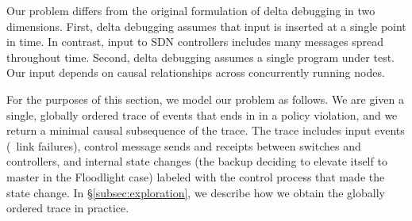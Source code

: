 
Our problem differs from the original formulation of delta debugging in two dimensions.
First, delta debugging assumes that input is inserted at a single point in
time. In contrast, input to SDN controllers includes many messages spread
throughout time.
Second, delta debugging assumes a single program under test. Our input depends on
causal relationships across
concurrently running nodes.

For the purposes of this section, we model our problem as follows.
We are given a single, globally ordered trace of events that ends in
in a policy violation, and we return a minimal causal subsequence
of the trace. The trace includes input events
(\eg~link failures), control message sends and receipts between
switches and controllers,
and internal state changes (\eg the
backup deciding to elevate itself to master in the Floodlight case) labeled
with the control process that made the state change.
In \S\ref{subsec:exploration}, we describe how we obtain the globally
ordered trace in practice.

